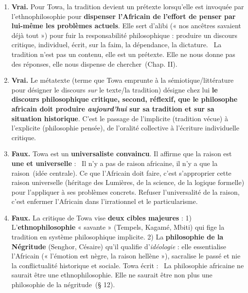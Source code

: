 \documentclass[11pt]{article}
\newcommand{\cle}[1]{{\popxbold\color{popdark}#1}}
\begin{document}
\begin{corrige}
\begin{enumerate}
\item \textbf{Vrai.} Pour Towa, la tradition devient un \cle{prétexte} lorsqu'elle est invoquée par l'ethnophilosophie pour \textbf{dispenser l'Africain de l'effort de penser par lui-même les problèmes actuels}. Elle sert d'alibi (« nos ancêtres savaient déjà tout ») pour fuir la responsabilité philosophique : produire un discours critique, individuel, écrit, sur la faim, la dépendance, la dictature. \guillemotleft~La tradition n'est pas un contenu, elle est un prétexte. Elle ne nous donne pas des réponses, elle nous dispense de chercher~\guillemotright (Chap. II).
\item \textbf{Vrai.} Le \cle{métatexte} (terme que Towa emprunte à la sémiotique/littérature pour désigner le discours \emph{sur} le texte/la tradition) désigne chez lui \textbf{le discours philosophique critique, second, réflexif, que le philosophe africain doit produire \emph{aujourd'hui} sur sa tradition et sur sa situation historique}. C'est le passage de l'implicite (tradition vécue) à l'explicite (philosophie pensée), de l'oralité collective à l'écriture individuelle critique.
\item \textbf{Faux.} Towa est un \textbf{universaliste convaincu}. Il affirme que la raison est \textbf{une et universelle} : \guillemotleft~Il n'y a pas de raison africaine, il n'y a que la raison~\guillemotright (idée centrale). Ce que l'Africain doit faire, c'est s'approprier cette raison universelle (héritage des Lumières, de la science, de la logique formelle) pour l'appliquer à ses problèmes concrets. Refuser l'universalité de la raison, c'est enfermer l'Africain dans l'irrationnel et le particularisme.
\item \textbf{Faux.} La critique de Towa vise \textbf{deux cibles majeures} : 1) L'\textbf{ethnophilosophie} « savante » (Tempels, Kagamé, Mbiti) qui fige la tradition en système philosophique implicite. 2) La \textbf{philosophie de la Négritude} (Senghor, Césaire) qu'il qualifie d'\emph{idéologie} : elle essentialise l'Africain (« l'émotion est nègre, la raison hellène »), sacralise le passé et nie la conflictualité historique et sociale. Towa écrit : \guillemotleft~La philosophie africaine ne saurait être une ethnophilosophie. Elle ne saurait être non plus une philosophie de la négritude~\guillemotright (§ 12).
\end{enumerate}
\end{corrige}
\end{document}
